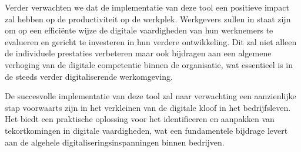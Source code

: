 Verder verwachten we dat de implementatie van deze tool een positieve impact zal hebben op de productiviteit op de werkplek. Werkgevers zullen in staat zijn om op een efficiënte wijze de digitale vaardigheden van hun werknemers te evalueren en gericht te investeren in hun verdere ontwikkeling. Dit zal niet alleen de individuele prestaties verbeteren maar ook bijdragen aan een algemene verhoging van de digitale competentie binnen de organisatie, wat essentieel is in de steeds verder digitaliserende werkomgeving.

De succesvolle implementatie van deze tool zal naar verwachting een aanzienlijke stap voorwaarts zijn in het verkleinen van de digitale kloof in het bedrijfsleven. Het biedt een praktische oplossing voor het identificeren en aanpakken van tekortkomingen in digitale vaardigheden, wat een fundamentele bijdrage levert aan de algehele digitaliseringsinspanningen binnen bedrijven.